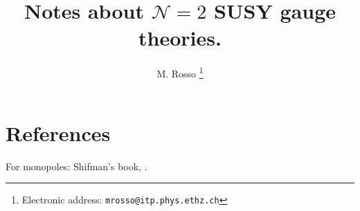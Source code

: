 \documentclass[10pt,a4paper]{article}
\title{Notes about \texorpdfstring{$\mathcal{N}=2$}{N=2} SUSY gauge theories.}
\numberwithin{equation}{section}
\begin{document}
\author{M. Rosso \thanks{Electronic address: \texttt{mrosso@itp.phys.ethz.ch}}}
\date{}

\maketitle

\section{References}
\label{sec:references}

For monopoles: Shifman's book,
\cite{Weinberg2007,Harvey1996,Coleman1982,DiVecchia1998}.


\newpage



\end{document}
